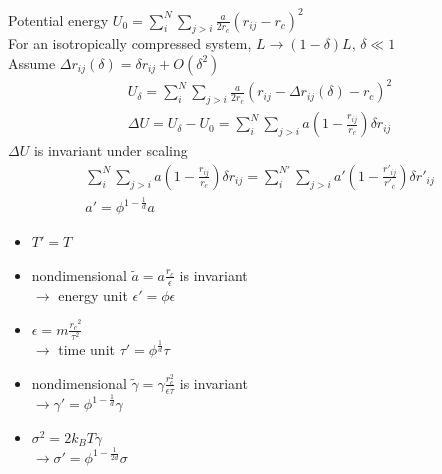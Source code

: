 \documentclass{beamer}
\begin{document}
\begin{frame}
Potential energy $U_0 = \sum_i^N \sum_{j>i} \frac{a}{2r_c} {(r_{ij}-r_c)}^2$ \\
For an isotropically compressed system, $L \rightarrow (1-\delta)L$, $\delta \ll 1$ \\
Assume $\Delta r_{ij}(\delta) = \delta r_{ij} + O(\delta^2)$
\begin{gather*}
    U_{\delta} = \sum_i^N \sum_{j>i} \frac{a}{2r_c} {(r_{ij} - \Delta r_{ij} (\delta) - r_c)}^2 \\
    \Delta U = U_{\delta} - U_0 = \sum_i^N \sum_{j>i} a(1- \frac{r_{ij}}{r_c})\delta r_{ij}
\end{gather*}
$\Delta U$ is invariant under scaling
\begin{gather*}
    \sum_i^N \sum_{j>i} a(1- \frac{r_{ij}}{r_c})\delta r_{ij} = \sum_i^{N'} \sum_{j>i}a'(1- \frac{r'_{ij}}{r'_c})\delta r'_{ij} \\
    a' = \phi^{1-\frac{1}{d}}a
\end{gather*}
\end{frame}

\begin{frame}
\begin{itemize}
\item $T' = T$
\item nondimensional $\tilde{a} = a \frac{r_c}{\epsilon}$ is invariant \\
    $\rightarrow$ energy unit $\epsilon'=\phi \epsilon$
\item $\epsilon=m\frac{{r_c}^2}{\tau^2}$ \\
    $\rightarrow$ time unit $\tau'=\phi^{\frac{1}{d}}\tau$
\item nondimensional $\tilde{\gamma} = \gamma \frac{r_c^2}{\epsilon \tau}$ is invariant \\
    $\rightarrow \gamma'=\phi^{1-\frac{1}{d}} \gamma$
\item $\sigma^2 = 2 k_B T \gamma$ \\
    $\rightarrow \sigma'=\phi^{1-\frac{1}{2d}}\sigma$
\end{itemize}
\end{frame}
\end{document}
